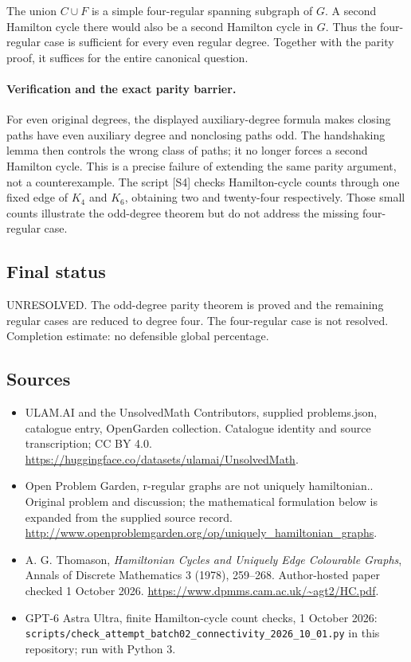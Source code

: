 \documentclass[11pt,a4paper]{article}
\begin{document}
The union $C\cup F$ is a simple four-regular spanning subgraph of
$G$. A second Hamilton cycle there would also be a second Hamilton
cycle in $G$. Thus the four-regular case is sufficient for every
even regular degree. Together with the parity proof, it suffices for
the entire canonical question.

\paragraph{Verification and the exact parity barrier.}
For even original degrees, the displayed auxiliary-degree formula
makes closing paths have even auxiliary degree and nonclosing paths
odd. The handshaking lemma then controls the wrong class of paths;
it no longer forces a second Hamilton cycle. This is a precise failure
of extending the same parity argument, not a counterexample. The
script [S4] checks Hamilton-cycle counts through one fixed edge of
$K_4$ and $K_6$, obtaining two and twenty-four respectively. Those
small counts illustrate the odd-degree theorem but do not address
the missing four-regular case.

\subsection{Final status}
UNRESOLVED. The odd-degree parity theorem is proved and the remaining
regular cases are reduced to degree four. The four-regular case is
not resolved. Completion estimate: no defensible global percentage.

\subsection{Sources}
\begin{itemize}
\item[S1] ULAM.AI and the UnsolvedMath Contributors, supplied problems.json, catalogue entry, OpenGarden collection. Catalogue identity and source transcription; CC BY 4.0.
\url{https://huggingface.co/datasets/ulamai/UnsolvedMath}.
\item[S2] Open Problem Garden, r-regular graphs are not uniquely hamiltonian.. Original problem and discussion; the mathematical formulation below is expanded from the supplied source record.
\url{http://www.openproblemgarden.org/op/uniquely_hamiltonian_graphs}.
\item[S3] A. G. Thomason, \emph{Hamiltonian Cycles and Uniquely Edge Colourable Graphs}, Annals of Discrete Mathematics 3 (1978), 259--268. Author-hosted paper checked 1 October 2026.
\url{https://www.dpmms.cam.ac.uk/~agt2/HC.pdf}.
\item[S4] GPT-6 Astra Ultra, finite Hamilton-cycle count checks, 1 October 2026: \texttt{scripts/check\_attempt\_batch02\_connectivity\_2026\_10\_01.py} in this repository; run with Python 3.
\end{itemize}
\end{document}

